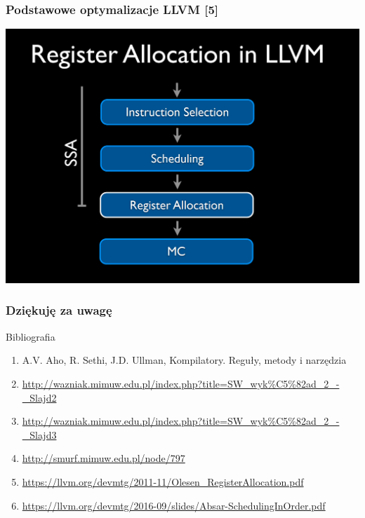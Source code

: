 \documentclass{beamer}
\begin{document}
	\begin{frame}
		\frametitle{Podstawowe optymalizacje LLVM [5]}
		\includegraphics[width=\textwidth]{llvm.png}
	\end{frame}


	\begin{frame}
	 \frametitle{Dziękuję za uwagę}
	 Bibliografia
	 \begin{enumerate}
		\item A.V. Aho, R. Sethi, J.D. Ullman, Kompilatory. Reguły, metody i narzędzia
		\item \url{http://wazniak.mimuw.edu.pl/index.php?title=SW_wyk\%C5\%82ad_2_-_Slajd2}
		\item \url{http://wazniak.mimuw.edu.pl/index.php?title=SW_wyk\%C5\%82ad_2_-_Slajd3}
		\item \url{http://smurf.mimuw.edu.pl/node/797}
		\item \url{https://llvm.org/devmtg/2011-11/Olesen_RegisterAllocation.pdf}
		\item \url{https://llvm.org/devmtg/2016-09/slides/Absar-SchedulingInOrder.pdf}
	 \end{enumerate}
	\end{frame}
\end{document}
